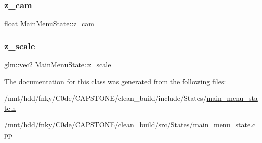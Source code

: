 \subsubsection{\texorpdfstring{z\+\_\+cam}{z\_cam}}
{\footnotesize\ttfamily float Main\+Menu\+State\+::z\+\_\+cam\hspace{0.3cm}{\ttfamily [private]}}

\mbox{\label{classMainMenuState_a39439fa006bd5af7acc63d0735a031f9}} 
\subsubsection{\texorpdfstring{z\+\_\+scale}{z\_scale}}
{\footnotesize\ttfamily glm\+::vec2 Main\+Menu\+State\+::z\+\_\+scale\hspace{0.3cm}{\ttfamily [private]}}



The documentation for this class was generated from the following files\+:\begin{DoxyCompactItemize}
\item 
/mnt/hdd/fnky/\+C0de/\+C\+A\+P\+S\+T\+O\+N\+E/clean\+\_\+build/include/\+States/\hyperlink{main__menu__state_8h}{main\+\_\+menu\+\_\+state.\+h}\item 
/mnt/hdd/fnky/\+C0de/\+C\+A\+P\+S\+T\+O\+N\+E/clean\+\_\+build/src/\+States/\hyperlink{main__menu__state_8cpp}{main\+\_\+menu\+\_\+state.\+cpp}\end{DoxyCompactItemize}
